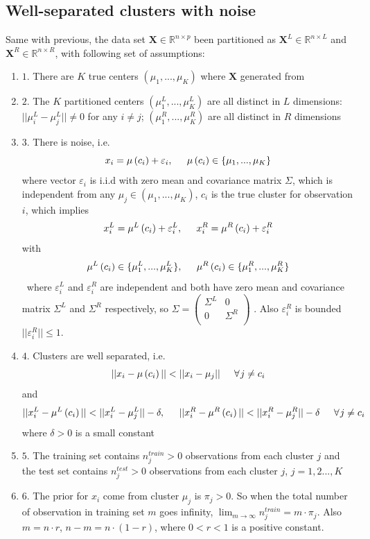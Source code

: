\documentclass[11pt]{article}
\begin{document}
\subsection{Well-separated clusters with noise}
Same with previous, the data set $\mathbf{X} \in \mathbb{R}^{n \times p}$ been partitioned as $\mathbf{X}^L \in \mathbb{R}^{n \times L}$ and $\mathbf{X}^R \in \mathbb{R}^{n \times R}$, with following set of assumptions:
\begin{enumerate}[label={Assumption},leftmargin=*]
	\item $1.$ There are $K$ true centers $(\mu_1,...,\mu_K)$ where $\mathbf{X}$ generated from
	\item $2.$ The $K$ partitioned centers $(\mu^L_1,...,\mu^L_K)$ are all distinct in $L$ dimensions: $||\mu^L_i-\mu^L_j|| \neq 0$ for any $i \neq j$; $(\mu^R_1,...,\mu^R_K)$ are all distinct in $R$ dimensions
	\item $3.$ There is noise, i.e. $$x_i = \mu \left(c_i\right) + \varepsilon_i, \hspace{0.2 in} \mu \left(c_i\right) \in \{\mu_1,...,\mu_K\}$$ where vector $\varepsilon_i$ is i.i.d with zero mean and covariance matrix $\Sigma$, which is independent from any $\mu_j \in (\mu_1,...,\mu_K)$, $c_i$ is the true cluster for observation $i$, which implies $$x^L_i = \mu^L \left(c_i\right) + \varepsilon^L_i,\hspace{0.2in} x^R_i = \mu^R \left(c_i\right) + \varepsilon^R_i$$ 
with $$\mu^L\left(c_i\right) \in \{\mu^L_1,...,\mu^L_K\},\hspace{0.2in} \mu^R\left(c_i\right) \in \{\mu^R_1,...,\mu^R_K\} $$\
where $\varepsilon^L_i$ and $\varepsilon^R_i$ are independent and both have zero mean and covariance matrix $\Sigma^L$ and $\Sigma^R$ respectively, so $\Sigma = 
\begin{pmatrix}
  \Sigma^L &0\\
  0  &\Sigma^R\\
  \end{pmatrix}$
. Also $\varepsilon^R_i$ is bounded $||\varepsilon^R_i|| \leq 1$.
	\item $4.$ Clusters are well separated, i.e. \[ ||x_i-\mu \left(c_i\right)|| < ||x_i-\mu_{j}|| \hspace{0.2 in}\forall \hspace{0.01 in}j\neq c_i \] and \[ ||x^L_i-\mu^L \left(c_i\right)|| < ||x^L_i-\mu^L_{j}||-\delta,  \hspace{0.2 in}||x^R_i-\mu^R \left(c_i\right)|| < ||x^R_i-\mu^R_{j}||-\delta \hspace{0.2 in}\forall \hspace{0.01 in}j\neq c_i\] where $\delta > 0$ is a small constant 
	\item $5.$ The training set contains $n^{train}_j>0$ observations from each cluster $j$ and the test set contains $n^{test}_j > 0$ observations from each cluster $j$, $j=1,2...,K$
	\item $6.$ The prior for $x_i$ come from cluster $\mu_j$ is $\pi_j > 0$. So when the total number of observation in training set $m$ goes infinity, $\lim_{m\to \infty} n^{train}_j = m \cdot \pi_j $. Also $m=n\cdot r$, $n-m = n\cdot (1-r)$, where $0<r<1$ is a positive constant.
\end{enumerate}
\end{document}
